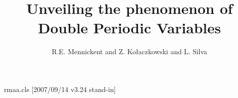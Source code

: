 \begin{filecontents*}{rmaa.cls}
[2007/09/14 v3.24 stand-in]
\newcommand{\altaffilmark}[1]{\textsuperscript{#1}}
\newcommand{\altaffiltext}[2]{\stepcounter{footnote}%
  \protected@xdef\@thanks{\@thanks\protect\footnotetext[#1]{#2}}}
\newcommand{\@resumen}{}
\newcommand{\resumen}[1]{\renewcommand{\@resumen}{{\ignorespaces#1}}}
\newif\if@abstractpresent
\renewcommand{\abstract}[1]{\renewcommand{\@abstract}{{\ignorespaces#1}}\@abstractpresenttrue}
\newcommand{\@abstract}{}
\newcommand{\@kwdsep}{ --- }
\newif\if@firstkwd\@firstkwdtrue
\newcommand{\@keywords}{}
\newcommand{\addkeyword}[1]{\if@firstkwd\renewcommand\@keywords{#1}\@firstkwdfalse
  \else\edef\@keywords{\@keywords\@kwdsep #1}\fi}
\newcommand{\keywords}[1]{\renewcommand{\@keywords}{#1}}
\newcommand{\shorttitle}[1]{\renewcommand\@shorttitle{\MakeUppercase{#1}}}
\newcommand{\@shorttitle}{SHORT TITLE GOES HERE}
\renewcommand{\@oddhead}{\hfil\@shorttitle\hfil\llap{\thepage}}
\renewcommand{\maketitle}{\par\begingroup\newpage\@maketitle\@thanks\endgroup
  \let\maketitle\relax\let\@maketitle\relax\gdef\@thanks{}\gdef\@author{}\gdef\@title{}}
\renewcommand{\@maketitle}{\null
  \begin{center}{\@title\par}\medskip\parbox{.8\textwidth}{\centering\@author\par}\par
    \if@abstractpresent\parbox{.8\textwidth}{\centerline{\bfseries Resumen}\par\@resumen
      \centerline{\bfseries Abstract}\par\@abstract\par
      \noindent Key Words:~\@keywords}\fi
  \end{center}\par}
\end{filecontents*}
\documentclass[preprint,proceedings]{rmaa}
\title{Unveiling the phenomenon of Double Periodic Variables}
\author{R.E. Mennickent and Z. Ko{\l}aczkowski and L. Silva}

\maketitle
Body.

